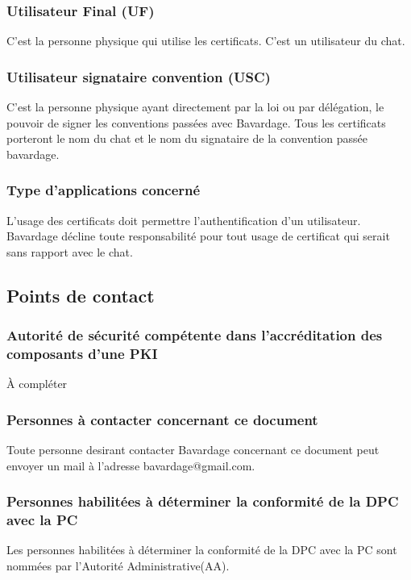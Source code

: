 \documentclass[a4paper,11pt,french]{book}
\begin{document}
\subsubsection{ Utilisateur Final (UF)}

C'est la personne physique qui utilise les certificats. C'est un utilisateur du chat.

\subsubsection{Utilisateur signataire convention (USC)}

C'est la personne physique ayant directement par la loi ou par délégation, le pouvoir de signer les conventions passées avec Bavardage. Tous les certificats porteront le nom du chat et le nom du signataire de la convention passée bavardage. 
		
\subsubsection{Type d'applications concerné}

L'usage des certificats doit permettre l'authentification d'un utilisateur. Bavardage décline toute responsabilité pour tout usage de certificat qui serait sans rapport avec le chat.

\subsection{Points de contact}
\subsubsection{Autorité de sécurité compétente dans l'accréditation des composants d'une PKI}
		À compléter
		
\subsubsection{Personnes à contacter concernant ce document}		
Toute personne desirant contacter Bavardage concernant ce document peut envoyer un mail à l'adresse bavardage@gmail.com.

\subsubsection{Personnes habilitées à déterminer la conformité de la DPC avec la PC}

Les personnes habilitées à déterminer la conformité de la DPC avec la PC sont nommées par l’Autorité Administrative(AA).
\end{document}
